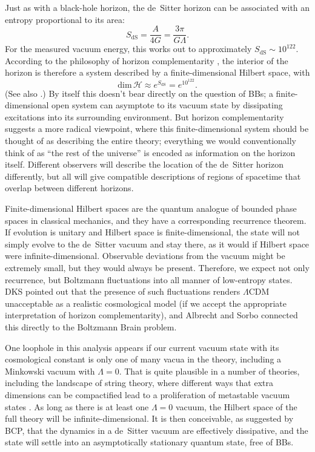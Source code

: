 \documentclass[12pt,letterpaper]{article}
\newcommand{\be}{\begin{equation}}
\newcommand{\ee}{\end{equation}}
\newcommand{\calh}{{\mathcal H}}
\newcommand{\dS}{{\mathrm{dS}}}
\begin{document}
Just as with a black-hole horizon, the de~Sitter horizon can be associated with an entropy proportional to its area:
\be
  S_\dS = \frac{A}{4G} = \frac{3\pi}{G\Lambda}.
\ee
For the measured vacuum energy, this works out to approximately $S_\dS \sim 10^{122}$.
According to the philosophy of horizon complementarity \cite{Susskind:1993if}, the interior of the horizon is therefore a system described by a finite-dimensional Hilbert space, with
\be
  \mathrm{dim}\,{\calh} \approx e^{S_\dS} = e^{10^{122}}.
\ee
(See also \cite{Banks:2002wr,Albrecht:2004ke,Parikh:2004wh,Banks:2006rx}.)
By itself this doesn't bear directly on the question of BBs; a finite-dimensional open system can asymptote to its vacuum state by dissipating excitations into its surrounding environment.
But horizon complementarity suggests a more radical viewpoint, where this finite-dimensional system should be thought of as describing the entire theory; everything we would conventionally think of as ``the rest of the universe'' is encoded as information on the horizon itself.
Different observers will describe the location of the de~Sitter horizon differently, but all will give compatible descriptions of regions of spacetime that overlap between different horizons.

Finite-dimensional Hilbert spaces are the quantum analogue of bounded phase spaces in classical mechanics, and they have a corresponding recurrence theorem.
If evolution is unitary and Hilbert space is finite-dimensional, the state will not simply evolve to the de~Sitter vacuum and stay there, as it would if Hilbert space were infinite-dimensional.
Observable deviations from the vacuum might be extremely small, but they would always be present.
Therefore, we expect not only recurrence, but Boltzmann fluctuations into all manner of low-entropy states.
DKS pointed out that the presence of such fluctuations renders $\Lambda$CDM unacceptable as a realistic cosmological model (if we accept the appropriate interpretation of horizon complementarity), and Albrecht and Sorbo \cite{Albrecht:2004ke} connected this directly to the Boltzmann Brain problem.

One loophole in this analysis appears if our current vacuum state with its cosmological constant is only one of many vacua in the theory, including a Minkowski vacuum with $\Lambda = 0$.
That is quite plausible in a number of theories, including the landscape of string theory, where different ways that extra dimensions can be compactified lead to a proliferation of metastable vacuum states \cite{Bousso:2000xa,Kachru:2003aw,Susskind:2003kw}.
As long as there is at least one $\Lambda=0$ vacuum, the Hilbert space of the full theory will be infinite-dimensional.
It is then conceivable, as suggested by BCP, that the dynamics in a de~Sitter vacuum are effectively dissipative, and the state will settle into an asymptotically stationary quantum state, free of BBs. 
\end{document}
